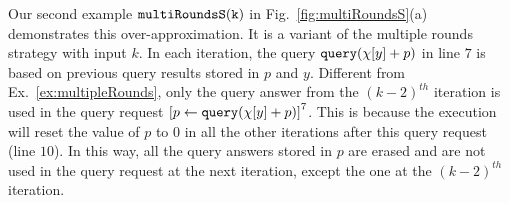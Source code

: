 %
Our second example $\mathtt{multiRoundsS(k)}$ in Fig.~\ref{fig:multiRoundsS}(a) demonstrates this over-approximation.
    It is a variant of the multiple rounds strategy with input $k$.
    In each iteration, the query ${\tt query}(\chi[y] + p)$ in line $7$ is based on previous query results stored in $p$ and $y$.
    Different from Ex.~\ref{ex:multipleRounds},
    only the query answer from the $(k - 2)^{th}$ iteration is used in the query request
    $\clabel{\assign{p}{\query(\chi[y]+p)} }^{7}$.
    This is because the execution will reset
    the value of $p$ to $0$ in all the other iterations
    after this query request (line $10$).
    In this way, all the query answers stored in $p$ are erased and are not used
    in the query request at the next iteration, except the one at the $(k - 2)^{th}$ iteration.
